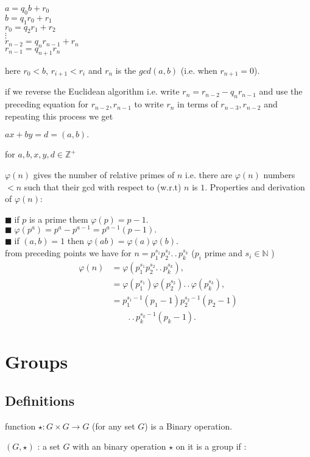\documentclass[11pt]{extarticle}
\newcommand{\Na}{\mathbb{N}}
\newcommand{\Z}{\mathbb{Z}}
\newcommand{\ra}{\rightarrow}
\newcommand{\ck}{.\,.\,}
\newcommand{\snote}[1]{{\footnotesize(#1)}}
\newcommand{\y}{$\blacksquare\;$}
\newcommand{\tbx}[2][]{
	\begin{tcolorbox}[enhanced,breakable,size=small,colback=black!2!white,title={#1},arc is angular, arc=1.5mm,drop fuzzy shadow]
		#2
	\end{tcolorbox}
}
\begin{document}
\begin{multicols}{2}
{		\begin{center}
			$a=q_0b+r_0$\\
			$b=q_1r_0+r_1$\\
			$r_0=q_2r_1+r_2$\\
			$\vdots$\\
			$r_{n-2}=q_{n}r_{n-1}+r_n$\\
			$r_{n-1}=q_{n+1} r_n$
		\end{center}
		here $ r_0<b $, $ r_{i+1}<r_i $ and $r_n$ is the $gcd(a,b)$ \snote{i.e. when $ r_{n+1}=0 $}.
	} 
	\tbx{ if we reverse the Euclidean algorithm i.e. write $r_n=r_{n-2}-q_nr_{n-1}$ and use the 
		preceding equation for $r_{n-2},r_{n-1}$ to write $r_n$ in terms of $r_{n-3},r_{n-2}$ and 
		repeating this process we get 
		\begin{center}
			$ax+by=d=(a,b).$
		\end{center}
		for $a,b,x,y,d\in \Z^+$
	} 
	\tbx[Euler's $\varphi$ function]{ $\varphi(n)$ gives the number of relative primes of $n$
		i.e. there are $\varphi(n)$ numbers $<n$ such that their gcd with respect to (w.r.t) $n$ is
		$1.$ Properties and derivation of $\varphi(n)$:
		
			\y  if $p$ is a prime them $\varphi(p)=p-1.$ \\
			\y  $\varphi(p^a)=p^a-p^{a-1}=p^{a-1}(p-1).$ \\
			\y  if $(a,b)=1$ then $\varphi(ab)=\varphi(a)\varphi(b).$ \\
		from preceding points we have
		for  $n=p_1^{s_1}p_2^{s_2}\ck p_k^{s_k}$ ({\footnotesize $p_i$ prime and $s_i\in \Na$ )}
		\begin{align*}
			\varphi (n) & =\varphi(p_1^{s_1}p_2^{s_2}\ck p_k^{s_k}),\\
			& =\varphi (p_1^{s_1}) \varphi (p_2^{s_2}) \ck \varphi (p_k^{s_k}),\\ 		
			& =p_1^{s_1-1}(p_1-1)p_2^{s_2-1}(p_2-1)\\			
			&\qquad \ck p_k^{s_k-1}(p_k-1).
		\end{align*}
	}
	
	\section{Groups}
	\subsection{Definitions}
	
	\tbx[\textbf{Binary operation}]{function $\star : G\times G \ra G$ (for any set $G$) is a
		Binary  operation.
	}
	\tbx[\textbf{Group} ]{$(G,\star)$ : a set $G$ with an binary operation $\star$ on it is a group 
		if :
		
}
\end{multicols}
\end{document}
